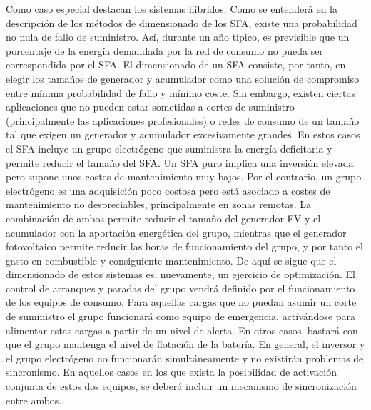 Como caso especial destacan los sistemas híbridos. Como se entenderá
en la descripción de los métodos de dimensionado de los SFA, existe
una probabilidad no nula de fallo de suministro. Así, durante un año
típico, es previsible que un porcentaje de la energía demandada por
la red de consumo no pueda ser correspondida por el SFA. El dimensionado
de un SFA consiste, por tanto, en elegir los tamaños de generador
y acumulador como una solución de compromiso entre mínima probabilidad
de fallo y mínimo coste. Sin embargo, existen ciertas aplicaciones
que no pueden estar sometidas a cortes de suministro (principalmente
las aplicaciones profesionales) o redes de consumo de un tamaño tal
que exigen un generador y acumulador excesivamente grandes. En estos
casos el SFA incluye un grupo electrógeno que suministra la energía
deficitaria y permite reducir el tamaño del SFA. Un SFA puro implica
una inversión elevada pero supone unos costes de mantenimiento muy
bajos. Por el contrario, un grupo electrógeno es una adquisición poco
costosa pero está asociado a costes de mantenimiento no despreciables,
principalmente en zonas remotas. La combinación de ambos permite reducir
el tamaño del generador FV y el acumulador con la aportación energética
del grupo, mientras que el generador fotovoltaico permite reducir
las horas de funcionamiento del grupo, y por tanto el gasto en combustible
y consiguiente mantenimiento. De aquí se sigue que el dimensionado
de estos sistemas es, nuevamente, un ejercicio de optimización. El
control de arranques y paradas del grupo vendrá definido por el funcionamiento
de los equipos de consumo. Para aquellas cargas que no puedan asumir
un corte de suministro el grupo funcionará como equipo de emergencia,
activándose para alimentar estas cargas a partir de un nivel de alerta.
En otros casos, bastará con que el grupo mantenga el nivel de flotación
de la batería. En general, el inversor y el grupo electrógeno no funcionarán
simultáneamente y no existirán problemas de sincronismo. En aquellos
casos en los que exista la posibilidad de activación conjunta de estos
dos equipos, se deberá incluir un mecanismo de sincronización entre
ambos. 

